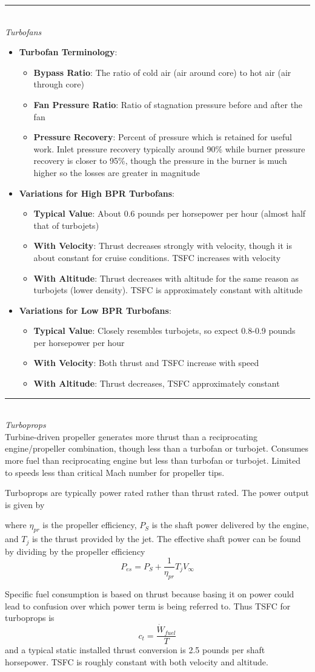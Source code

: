 \documentclass[12pt]{article}
\newcommand{\Item}[1]{\item \textbf{#1}:}
\newcommand{\Header}[1]{\noindent\rule{\textwidth}{0.4pt}\\\large{\textit{#1}}\normalsize{}}
\newcommand{\CenteredBoxed}[1]{\begin{center}\boxed{#1}\end{center}}
\newcommand{\Vinfty}{V_\infty}
\begin{document}
\Header{Turbofans}\\
\begin{itemize}
\Item{Turbofan Terminology}
	\begin{itemize}
	\Item{Bypass Ratio} The ratio of cold air (air around core) to hot air (air through core)
	\Item{Fan Pressure Ratio} Ratio of stagnation pressure before and after the fan
	\Item{Pressure Recovery} Percent of pressure which is retained for useful work. Inlet pressure recovery typically around 90\% while burner pressure recovery is closer to 95\%, though the pressure in the burner is much higher so the losses are greater in magnitude
	\end{itemize}
\Item{Variations for High BPR Turbofans}
	\begin{itemize}
	\Item{Typical Value} About 0.6 pounds per horsepower per hour (almost half that of turbojets)
	\Item{With Velocity} Thrust decreases strongly with velocity, though it is about constant for cruise conditions. TSFC increases with velocity
	\Item{With Altitude} Thrust decreases with altitude for the same reason as turbojets (lower density). TSFC is approximately constant with altitude
	\end{itemize}
\Item{Variations for Low BPR Turbofans}
	\begin{itemize}
	\Item{Typical Value} Closely resembles turbojets, so expect 0.8-0.9 pounds per horsepower per hour
	\Item{With Velocity} Both thrust and TSFC increase with speed
	\Item{With Altitude} Thrust decreases, TSFC approximately constant
	\end{itemize}
\end{itemize}

\Header{Turboprops}\\

Turbine-driven propeller generates more thrust than a reciprocating engine/propeller combination, though less than a turbofan or turbojet. Consumes more fuel than reciprocating engine but less than turbofan or turbojet. Limited to speeds less than critical Mach number for propeller tips.

Turboprops are typically power rated rather than thrust rated. The power output is given by
\CenteredBoxed{P_A=\eta_{pr}P_S+T_j\Vinfty}
where $\eta_{pr}$ is the propeller efficiency, $P_S$ is the shaft power delivered by the engine, and $T_j$ is the thrust provided by the jet. The effective shaft power can be found by dividing by the propeller efficiency
$$P_{es}=P_S+\frac{1}{\eta_{pr}}T_j\Vinfty$$

Specific fuel consumption is based on thrust because basing it on power could lead to confusion over which power term is being referred to. Thus TSFC for turboprops is
$$c_t=\frac{\dot{W}_{fuel}}{T}$$
and a typical static installed thrust conversion is 2.5 pounds per shaft horsepower. TSFC is roughly constant with both velocity and altitude.
\end{document}

